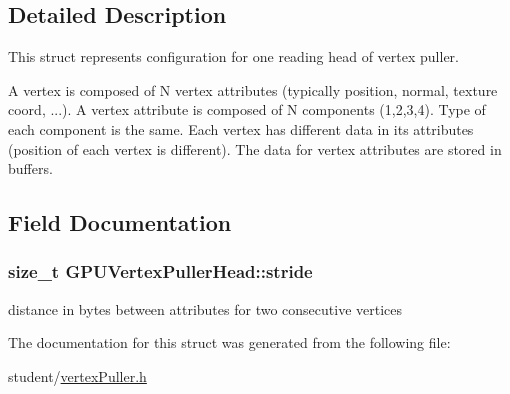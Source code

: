 \subsection{Detailed Description}
This struct represents configuration for one reading head of vertex puller. 

A vertex is composed of N vertex attributes (typically position, normal, texture coord, ...). A vertex attribute is composed of N components (1,2,3,4). Type of each component is the same. Each vertex has different data in its attributes (position of each vertex is different). The data for vertex attributes are stored in buffers. 

\subsection{Field Documentation}
\hypertarget{structGPUVertexPullerHead_a9b48e3de1de5716c6e5e8ffa6fcc2753}{
\subsubsection[{stride}]{\setlength{\rightskip}{0pt plus 5cm}size\-\_\-t G\-P\-U\-Vertex\-Puller\-Head\-::stride}}\label{structGPUVertexPullerHead_a9b48e3de1de5716c6e5e8ffa6fcc2753}
distance in bytes between attributes for two consecutive vertices 

The documentation for this struct was generated from the following file\-:\begin{DoxyCompactItemize}
\item 
student/\hyperlink{vertexPuller_8h}{vertex\-Puller.\-h}\end{DoxyCompactItemize}
